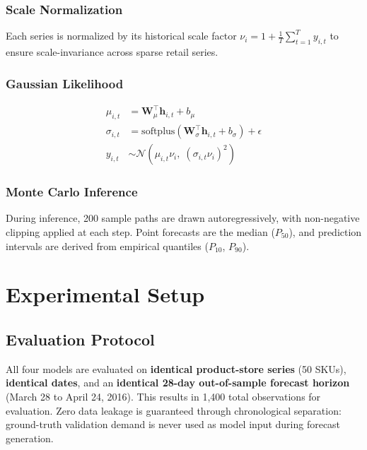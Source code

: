 \documentclass[conference]{IEEEtran}
\begin{document}
\subsubsection{Scale Normalization}
Each series is normalized by its historical scale factor $\nu_i = 1 + \frac{1}{T}\sum_{t=1}^{T} y_{i,t}$ to ensure scale-invariance across sparse retail series.

\subsubsection{Gaussian Likelihood}
\begin{align}
    \mu_{i,t} &= \mathbf{W}_\mu^\top \mathbf{h}_{i,t} + b_\mu \\
    \sigma_{i,t} &= \text{softplus}(\mathbf{W}_\sigma^\top \mathbf{h}_{i,t} + b_\sigma) + \epsilon \\
    y_{i,t} &\sim \mathcal{N}(\mu_{i,t} \nu_i,\; (\sigma_{i,t} \nu_i)^2)
\end{align}

\subsubsection{Monte Carlo Inference}
During inference, 200 sample paths are drawn autoregressively, with non-negative clipping applied at each step. Point forecasts are the median ($P_{50}$), and prediction intervals are derived from empirical quantiles ($P_{10}$, $P_{90}$).

\section{Experimental Setup}

\subsection{Evaluation Protocol}

All four models are evaluated on \textbf{identical product-store series} (50 SKUs), \textbf{identical dates}, and an \textbf{identical 28-day out-of-sample forecast horizon} (March 28 to April 24, 2016). This results in 1,400 total observations for evaluation. Zero data leakage is guaranteed through chronological separation: ground-truth validation demand is never used as model input during forecast generation.
\end{document}
